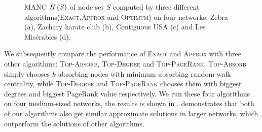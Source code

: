 \documentclass[sigconf]{acmart}
\begin{document}
\begin{figure}
  \caption{MANC \(H\left(S\right)\) of node set \(S\) computed by three different algorithms(\textsc{Exact},\textsc{Approx} and \textsc{Optimum}) on four networks: Zebra (a), Zachary karate club (b), Contiguous USA (c) and Les Misérables (d).\label{pic:compare-effect-optimum}}
\end{figure}

We subsequently compare the performance of \textsc{Exact} and \textsc{Approx} with three other algorithms: \textsc{Top-Absorb}, \textsc{Top-Degree} and \textsc{Top-PageRank}.
\textsc{Top-Absorb} simply chooses \(k\) absorbing nodes with minimum absorbing random-walk centrality, while \textsc{Top-Degree} and \textsc{Top-PageRank} chooses them with biggest degrees and biggest PageRank value respectively.
We run these four algorithms on four medium-sized networks, the results is shown in .
 demonstrates that both of our algorithms also get similar approximate solutions in larger networks, which outperform the solutions of other algorithms.
\end{document}
